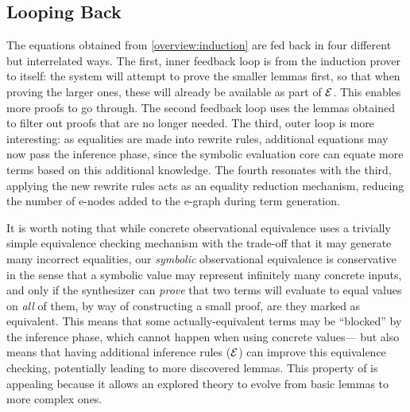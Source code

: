 \subsection{Looping Back}

The equations obtained from \autoref{overview:induction} are fed back in
four different but interrelated ways.
The first, inner feedback loop is from the induction prover to itself:
the system will attempt to prove the smaller lemmas first, so that when
proving the larger ones, these will already be available as part of $\mathcal{E}$.
This enables more proofs to go through.
The second feedback loop uses the lemmas obtained to filter out proofs that are no longer needed.
The third, outer loop is more interesting: as equalities are made into
rewrite rules, additional equations may now pass the inference phase,
since the symbolic evaluation core can equate more terms based on this
additional knowledge.
The fourth resonates with the third, applying the new rewrite rules acts as an equality reduction mechanism, reducing the number of e-nodes added to the e-graph during term generation.

It is worth noting that while concrete observational equivalence uses
a trivially simple equivalence checking mechanism with the trade-off
that it may generate many incorrect equalities,
our \emph{symbolic} observational equivalence is conservative in the
sense that a symbolic value may represent infinitely many concrete
inputs, and only if the synthesizer can \emph{prove} that two terms will
evaluate to equal values on \emph{all} of them, by way of constructing
a small proof, are they marked as equivalent.
This means that some actually-equivalent terms may be ``blocked'' by
the inference phase, which cannot happen when using concrete values---%
but also means that having additional inference rules ($\mathcal{E}$) can improve this equivalence checking, 
potentially leading to more discovered lemmas.
This property of \TheSy is appealing because it allows an explored theory to evolve from basic lemmas to more complex ones.

